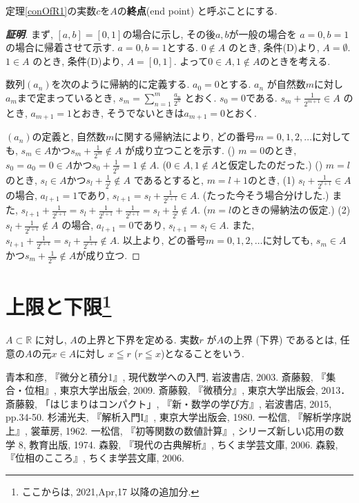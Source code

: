 \documentclass[11pt, a4paper, dvipdfmx]{jsarticle}
\theoremstyle{definition}
\newcommand{\R}{\mathbb{R}}
\newcommand{\dip}{\displaystyle}
\numberwithin{equation}{section} %
\def\Rnum#1{\uppercase\expandafter{\romannumeral #1}}
\begin{document}
定理\ref{conOfR1}の実数$c$を$A$の{\bf 終点}(end point) 
と呼ぶことにする. 

\begin{proof}[{\bf 証明}]
  まず, $[a,b]= [0,1]$の場合に示し, その後$a, b$が一般の場合を
  $a=0,b=1$の場合に帰着させて示す. $a=0, b=1$とする. $0\notin A$
  のとき, 条件(D)より, $A = \emptyset$. $1\in A$ のとき, 
  条件(D)より, $A=[0,1]$. よって$0\in A, 1 \notin A$のときを考える. 

  数列$(a_n)$を次のように帰納的に定義する. $a_0=0$とする. 
  $a_n$ が自然数$m$に対し$a_m$まで定まっているとき, 
  $\dip s_m = \sum_{n=1}^{m}\frac{a_n}{2^n}$ とおく. 
  $s_0 = 0$である. $\dip s_m + \frac{1}{2^{m+1}}\in A$
  のとき, $a_{m+1}=1$とおき, そうでないときは$a_{m+1}=0$とおく. 
  
  $(a_n)$の定義と, 自然数$m$に関する帰納法により, 
  どの番号$m=0,1,2,\dots$に対しても, 
  $s_m\in A$かつ$\dip s_m+\frac{1}{2^m}\notin A$
  が成り立つことを示す.
  (\Rnum{1}) $m=0$のとき, 
  $s_0=a_0=0\in A$かつ$\dip s_0+\frac{1}{2^0}=1\notin A$. 
  ($0\in A, 1\notin A$と仮定したのだった.)
  (\Rnum{2}) $m=l$のとき, 
  $s_l\in A$かつ$\dip s_l+\frac{1}{2^l}\notin A$
  であるとすると, 
  $m=l+1$のとき, 
  (1) 
  $\dip s_l + \frac{1}{2^{l+1}} \in A$ の場合, 
  $a_{l+1}=1$であり, 
  $\dip s_{l+1}= s_l + \frac{1}{2^{l+1}}\in A$. (たった今そう場合分けした.)
  また, $\dip s_{l+1}+\frac{1}{2^{l+1}}=s_l + \frac{1}{2^{l+1}} + \frac{1}{2^{l+1}}
  = s_l + \frac{1}{2^l} \notin A$. ($m=l$のときの帰納法の仮定.)
  (2) 
  $s_l + \dip\frac{1}{2^{l+1}} \notin A$ の場合, 
  $a_{l+1}=0$であり, 
  $s_{l+1}= s_l \in A$. 
  また, $\dip s_{l+1}+\dip\frac{1}{2^{l+1}}=s_l + \frac{1}{2^{l+1}}\notin A$. 
  以上より, 
  どの番号$m=0,1,2,\dots$に対しても, 
  $s_m\in A$かつ$\dip s_m+\frac{1}{2^m}\notin A$が成り立つ. 


\end{proof}



\section{上限と下限\footnote{ここからは, 2021,Apr,17 以降の追加分.}}
$A\subset \R$ に対し, $A$の上界と下界を定める. 
実数$r$ が$A$の上界 (下界) であるとは, 任意の$A$の元$x\in A$に対し
$x \leqq r$ ($r \leqq x$)となることをいう. 



\begin{thebibliography}{20}
\par
   青本和彦, 『微分と積分1』, 現代数学への入門, 岩波書店, 2003.
   斎藤毅, 『集合・位相』, 東京大学出版会, 2009. 
   斎藤毅, 『微積分』, 東京大学出版会, 2013．
   斎藤毅, 「はじまりはコンパクト」, 『新・数学の学び方』, 岩波書店, 2015, pp.34-50. 
   杉浦光夫, 『解析入門$\mathrm{I}$』, 東京大学出版会, 1980. 
   一松信, 『解析学序説 上』, 裳華房, 1962.
   一松信, 『初等関数の数値計算』, シリーズ新しい応用の数学 8, 教育出版, 1974. 
   森毅, 『現代の古典解析』, ちくま学芸文庫, 2006.
   森毅, 『位相のこころ』, ちくま学芸文庫, 2006.
\end{thebibliography}
\end{document}
